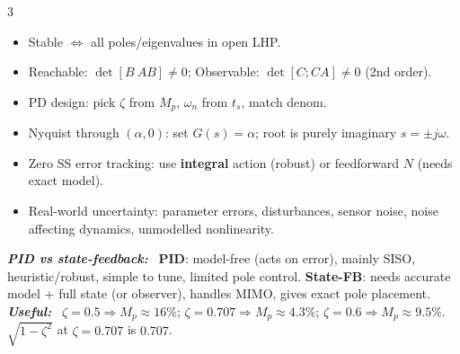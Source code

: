 \documentclass[9pt]{extarticle}
\newcommand{\sect}[1]{%
  \vspace{2pt}\par\noindent
  \colorbox{hdrbg}{\makebox[\dimexpr\linewidth-2\fboxsep][l]{%
    \textbf{\footnotesize\textcolor{hdr}{#1}}}}%
  \par\vspace{1.5pt}}
\newcommand{\sub}[1]{\textit{\textbf{#1:}}\ }
\begin{document}
\begin{multicols}{3}
\sect{20. Quick Reference / Exam Tips}
\begin{itemize}
\item Stable $\Leftrightarrow$ all poles/eigenvalues in open LHP.
\item Reachable: $\det[B\ AB]\neq0$; Observable: $\det[C;CA]\neq0$ (2nd order).
\item PD design: pick $\zeta$ from $M_p$, $\omega_n$ from $t_s$, match denom.
\item Nyquist through $(\alpha,0)$: set $G(s)=\alpha$; root is purely imaginary $s{=}\pm j\omega$.
\item Zero SS error tracking: use \textbf{integral} action (robust) or feedforward $N$ (needs exact model).
\item Real-world uncertainty: parameter errors, disturbances, sensor noise, noise affecting dynamics, unmodelled nonlinearity.
\end{itemize}
\sub{PID vs state-feedback} \textbf{PID}: model-free (acts on error), mainly SISO, heuristic/robust, simple to tune, limited pole control. \textbf{State-FB}: needs accurate model + full state (or observer), handles MIMO, gives exact pole placement.\\
\sub{Useful} $\zeta{=}0.5\!\Rightarrow\!M_p{\approx}16\%$; $\zeta{=}0.707\!\Rightarrow\!M_p{\approx}4.3\%$; $\zeta{=}0.6\!\Rightarrow\!M_p{\approx}9.5\%$.\\
$\sqrt{1-\zeta^2}$ at $\zeta{=}0.707$ is $0.707$.


\end{multicols}
\end{document}
